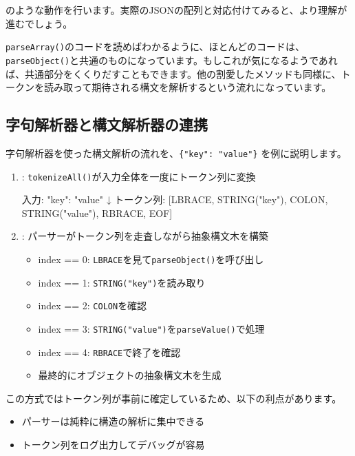 \noindent のような動作を行います。実際のJSONの配列と対応付けてみると、より理解が進むでしょう。

\texttt{parseArray()}のコードを読めばわかるように、ほとんどのコードは、\texttt{parseObject()}と共通のものになっています。もしこれが気になるようであれば、共通部分をくくりだすこともできます。他の割愛したメソッドも同様に、トークンを読み取って期待される構文を解析するという流れになっています。

\subsection{字句解析器と構文解析器の連携}

字句解析器を使った構文解析の流れを、\texttt{\{"key":\ "value"\}}
を例に説明します。

\begin{enumerate}
\item
  :
  \texttt{tokenizeAll()}が入力全体を一度にトークン列に変換

\begin{codescreen}{}
入力: {"key": "value"}
↓
トークン列: [LBRACE, STRING("key"), COLON, STRING("value"), RBRACE, EOF]
\end{codescreen}

\item
  :
  パーサーがトークン列を走査しながら抽象構文木を構築

\begin{itemize}
\item
  index == 0: \texttt{LBRACE}を見て\texttt{parseObject()}を呼び出し
\item
  index == 1: \texttt{STRING("key")}を読み取り
\item
  index == 2: \texttt{COLON}を確認
\item
  index == 3: \texttt{STRING("value")}を\texttt{parseValue()}で処理
\item
  index == 4: \texttt{RBRACE}で終了を確認
\item
  最終的にオブジェクトの抽象構文木を生成
\end{itemize}
\end{enumerate}

この方式ではトークン列が事前に確定しているため、以下の利点があります。

\begin{itemize}
\item
  パーサーは純粋に構造の解析に集中できる
\item
  トークン列をログ出力してデバッグが容易
\end{itemize}

